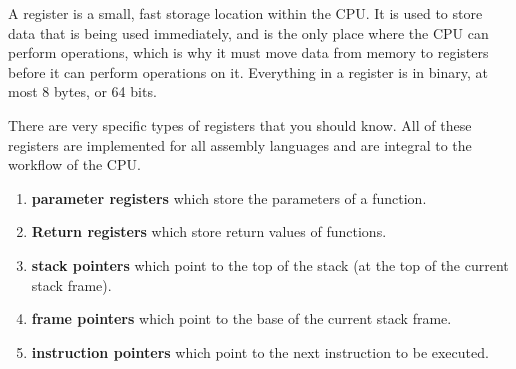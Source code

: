   \begin{definition}[Register]
    A register is a small, fast storage location within the CPU. It is used to store data that is being used immediately, and is the only place where the CPU can perform operations, which is why it must move data from memory to registers before it can perform operations on it. Everything in a register is in binary, at most 8 bytes, or 64 bits. 

    There are very specific types of registers that you should know. All of these registers are implemented for all assembly languages and are integral to the workflow of the CPU.  
    \begin{enumerate}
      \item \textbf{parameter registers} which store the parameters of a function.
      \item \textbf{Return registers} which store return values of functions. 
      \item \textbf{stack pointers} which point to the top of the stack (at the top of the current stack frame). 
      \item \textbf{frame pointers} which point to the base of the current stack frame.
      \item \textbf{instruction pointers} which point to the next instruction to be executed.
    \end{enumerate}
  \end{definition}

